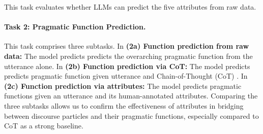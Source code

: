 \documentclass[11pt]{article}
\begin{document}


This task evaluates whether LLMs can predict the five attributes from raw data. 

\paragraph{Task 2: Pragmatic Function Prediction.} This task comprises three subtasks. In \textbf{(2a) Function prediction from raw data:} The model predicts predicts the overarching pragmatic function from the utterance alone. In \textbf{(2b) Function prediction via CoT:} The model predicts predicts pragmatic function given utterance and Chain-of-Thought (CoT) \citep{wei2022chain}. In \textbf{(2c) Function prediction via attributes:} The model predicts pragmatic functions given an utterance and its human-annotated attributes. Comparing the three subtasks allows us to confirm the effectiveness of attributes in bridging between discourse particles and their pragmatic functions, especially compared to CoT as a strong baseline.
\end{document}
